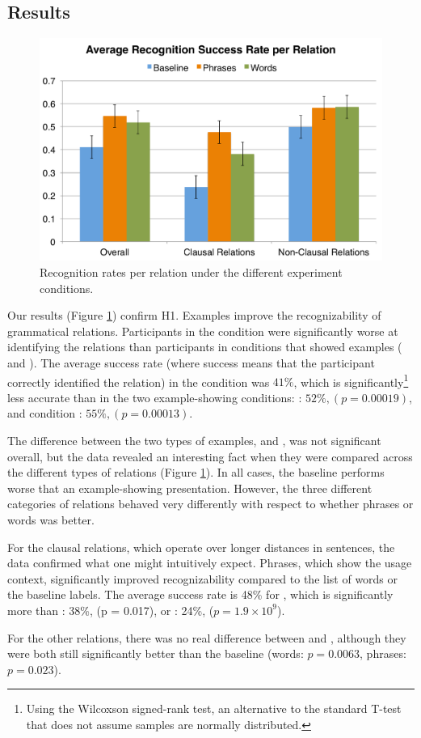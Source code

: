 \subsection{Results}
\begin{figure}
\centering
\includegraphics[width=\columnwidth]{fig/results}
\caption{\label{fig:results}Recognition rates per relation under the different experiment conditions.}
\end{figure}
Our results (Figure \ref{fig:results}) confirm H1. Examples improve the recognizability of grammatical relations. Participants in the  condition were significantly worse at identifying the relations than participants in conditions that showed examples ( and ).  The average success rate (where success means that the participant correctly identified the relation) in the  condition was $41\%$, which is significantly\footnote{Using the Wilcoxson signed-rank test, an alternative to the standard T-test that does not assume samples are normally distributed.} less accurate than in the two example-showing conditions: : $52\%, (p = 0.00019)$, and  condition : $55\%, (p = 0.00013)$.

The difference between the two types of examples,   and ,  was not significant overall, but the data revealed an interesting fact when they were compared across the different types  of relations (Figure \ref{fig:results}). In all cases, the baseline performs worse that an example-showing presentation. However, the three different categories of relations behaved very differently with respect to whether phrases or words was better.

For the clausal relations, which operate over longer distances in sentences, the data confirmed what one might intuitively expect. Phrases, which show the usage context, significantly improved recognizability compared to the list of words or the baseline labels. The average success rate is 48\% for , which is significantly more than : 38\%, (p = 0.017), or : 24\%, ($p= 1.9 \times 10^9$).

For the other relations, there was no real difference between  and , although they were both still significantly better than the baseline (words: $p=0.0063$, phrases: $p=0.023$).
